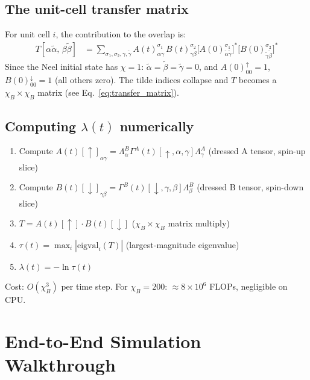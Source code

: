\documentclass[11pt, a4paper]{article}
\begin{document}
\subsection{The unit-cell transfer matrix}

For unit cell $i$, the contribution to the overlap is:
\begin{align}
  T[\alpha\tilde\alpha,\, \beta\tilde\beta]
  &= \sum_{\sigma_1, \sigma_2, \gamma, \tilde\gamma}
    A(t)^{\sigma_1}_{\alpha\gamma}\, B(t)^{\sigma_2}_{\gamma\beta}
    \bigl[A(0)^{\sigma_1}_{\tilde\alpha\tilde\gamma}\bigr]^*
    \bigl[B(0)^{\sigma_2}_{\tilde\gamma\tilde\beta}\bigr]^*
\end{align}
Since the Neel initial state has $\chi = 1$: $\tilde\alpha = \tilde\beta = \tilde\gamma = 0$, and $A(0)^{\uparrow}_{00} = 1$, $B(0)^{\downarrow}_{00} = 1$ (all others zero). The tilde indices collapse and $T$ becomes a $\chi_B \times \chi_B$ matrix (see Eq.~\eqref{eq:transfer_matrix}).

\subsection{Computing $\lambda(t)$ numerically}

\begin{enumerate}
  \item Compute $A(t)[\uparrow]_{\alpha\gamma} = \Lambda^B_\alpha \Gamma^A(t)[\uparrow, \alpha, \gamma] \Lambda^A_\gamma$ \quad (dressed A tensor, spin-up slice)
  \item Compute $B(t)[\downarrow]_{\gamma\beta} = \Gamma^B(t)[\downarrow, \gamma, \beta] \Lambda^B_\beta$ \quad (dressed B tensor, spin-down slice)
  \item $T = A(t)[\uparrow] \cdot B(t)[\downarrow]$ \quad ($\chi_B \times \chi_B$ matrix multiply)
  \item $\tau(t) = \max_i |\text{eigval}_i(T)|$ \quad (largest-magnitude eigenvalue)
  \item $\lambda(t) = -\ln \tau(t)$
\end{enumerate}
Cost: $O(\chi_B^3)$ per time step. For $\chi_B = 200$: $\approx 8 \times 10^6$ FLOPs, negligible on CPU.

\section{End-to-End Simulation Walkthrough}
\label{sec:walkthrough}
\end{document}

